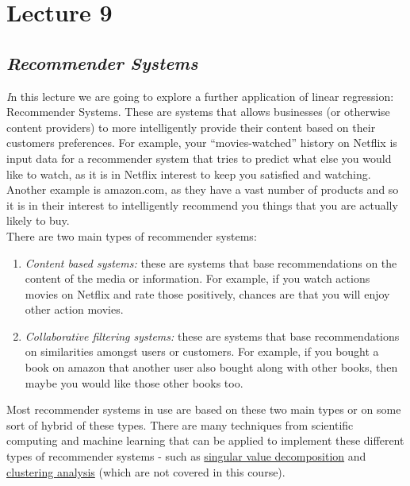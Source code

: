 \documentclass[11pt,a4paper,oneside]{report}
\begin{document}
\newpage
\section*{Lecture 9}

{\center\color{magenta}
\subsection*{\it\huge Recommender Systems}}

{\it\huge I}n this lecture we are going to explore a further application of linear regression: Recommender Systems. These are systems that allows businesses (or otherwise content providers) to more intelligently provide their content based on their customers preferences. For example, your ``movies-watched'' history on Netflix is input data for a recommender system that tries to predict what else you would like to watch, as it is in Netflix interest to keep you satisfied and watching. Another example is amazon.com, as they have a vast number of products and so it is in their interest to intelligently recommend you things that you are actually likely to buy.\\

There are two main types of recommender systems:
\begin{enumerate}
\item \emph{Content based systems: }these are systems that base recommendations on the content of the media or information. For example, if you watch actions movies on Netflix and rate those positively, chances are that you will enjoy other action movies.
\item \emph{Collaborative filtering systems: }these are systems that base recommendations on similarities amongst users or customers. For example, if you bought a book on amazon that another user also bought along with other books, then maybe you would like those other books too.\\
\end{enumerate}

Most recommender systems in use are based on these two main types or on some sort of hybrid of these types. There are many techniques from scientific computing and machine learning that can be applied to implement these different types of recommender systems - such as \href{https://en.wikipedia.org/wiki/Singular_value_decomposition}{singular value decomposition} and \href{https://en.wikipedia.org/wiki/Cluster_analysis}{clustering analysis} (which are not covered in this course). \\
\end{document}
